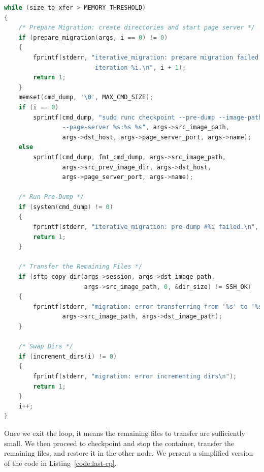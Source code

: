 \begin{lstlisting}[language=C,caption={Iterative migration internal loop.\label{code:iterative-loop}}]
while (size_to_xfer > MEMORY_THRESHOLD)
{
    /* Prepare Migration: create directories and start page server */
    if (prepare_migration(args, i == 0) != 0)
    {
        fprintf(stderr, "iterative_migration: prepare migration failed at \
                         iteration %i.\n", i + 1);
        return 1;
    }
    memset(cmd_dump, '\0', MAX_CMD_SIZE);
    if (i == 0)
        sprintf(cmd_dump, "sudo runc checkpoint --pre-dump --image-path %s \
                --page-server %s:%s %s", args->src_image_path, 
                args->dst_host, args->page_server_port, args->name);
    else
        sprintf(cmd_dump, fmt_cmd_dump, args->src_image_path,
                args->src_prev_image_dir, args->dst_host,
                args->page_server_port, args->name);

    /* Run Pre-Dump */
    if (system(cmd_dump) != 0)
    {
        fprintf(stderr, "iterative_migration: pre-dump #%i failed.\n", i);
        return 1;
    }

    /* Transfer the Remaining Files */
    if (sftp_copy_dir(args->session, args->dst_image_path, 
                      args->src_image_path, 0, &dir_size) != SSH_OK)
    {
        fprintf(stderr, "migration: error transferring from '%s' to '%s'\n",
                args->src_image_path, args->dst_image_path);
    }

    /* Swap Dirs */
    if (increment_dirs(i) != 0)
    {
        fprintf(stderr, "migration: error incrementing dirs\n");
        return 1;
    }
    i++;
}
\end{lstlisting}
Once we exit the loop, it means the remaining files to transfer are sufficiently small.
We then proceed to checkpoint and stop the container, transfer the remaining files, and restore it in the other node.
We persent a simplified version of the code in Listing~\ref{code:last-cp}.
